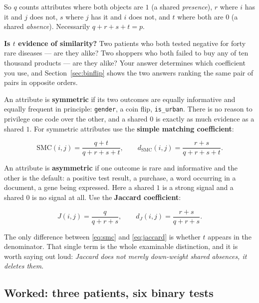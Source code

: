 \documentclass[11pt]{article}
\begin{document}
So $q$ counts attributes where both objects are $1$ (a shared
\emph{presence}), $r$ where $i$ has it and $j$ does not, $s$ where $j$ has
it and $i$ does not, and $t$ where both are $0$ (a shared \emph{absence}).
Necessarily $q + r + s + t = p$.

\begin{keyidea}
\textbf{Is $t$ evidence of similarity?} Two patients who both tested negative
for forty rare diseases --- are they alike? Two shoppers who both failed to
buy any of ten thousand products --- are they alike? Your answer determines
which coefficient you use, and Section~\ref{sec:binflip} shows the two
answers ranking the same pair of pairs in opposite orders.
\end{keyidea}

An attribute is \textbf{symmetric} if its two outcomes are equally
informative and equally frequent in principle: \texttt{gender}, a coin flip,
\texttt{is\_urban}. There is no reason to privilege one code over the other,
and a shared $0$ is exactly as much evidence as a shared $1$. For symmetric
attributes use the \textbf{simple matching coefficient}:

\begin{equation}
  \mathrm{SMC}(i,j) = \frac{q+t}{q+r+s+t},
  \qquad
  d_{\mathrm{SMC}}(i,j) = \frac{r+s}{q+r+s+t}.
  \label{eq:smc}
\end{equation}

An attribute is \textbf{asymmetric} if one outcome is rare and informative
and the other is the default: a positive test result, a purchase, a word
occurring in a document, a gene being expressed. Here a shared $1$ is a
strong signal and a shared $0$ is no signal at all. Use the \textbf{Jaccard
coefficient}:

\begin{equation}
  J(i,j) = \frac{q}{q+r+s},
  \qquad
  d_J(i,j) = \frac{r+s}{q+r+s}.
  \label{eq:jaccard}
\end{equation}

The only difference between \eqref{eq:smc} and \eqref{eq:jaccard} is whether
$t$ appears in the denominator. That single term is the whole examinable
distinction, and it is worth saying out loud: \emph{Jaccard does not merely
down-weight shared absences, it deletes them}.

\subsection{Worked: three patients, six binary tests}
\end{document}
